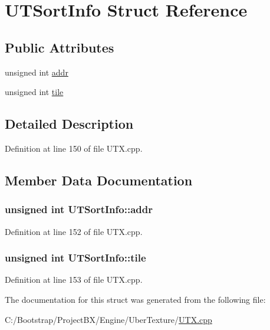 \hypertarget{struct_u_t_sort_info}{
\section{UTSortInfo Struct Reference}
\label{struct_u_t_sort_info}
}
\subsection*{Public Attributes}
\begin{CompactItemize}
\item 
unsigned int \hyperlink{struct_u_t_sort_info_47f8c27d741ef4ea2b59a783fc054655}{addr}
\item 
unsigned int \hyperlink{struct_u_t_sort_info_bf2cd136028eec8403fa5b74a111f523}{tile}
\end{CompactItemize}


\subsection{Detailed Description}


Definition at line 150 of file UTX.cpp.

\subsection{Member Data Documentation}
\hypertarget{struct_u_t_sort_info_47f8c27d741ef4ea2b59a783fc054655}{
\subsubsection[{addr}]{\setlength{\rightskip}{0pt plus 5cm}unsigned int {\bf UTSortInfo::addr}}}
\label{struct_u_t_sort_info_47f8c27d741ef4ea2b59a783fc054655}




Definition at line 152 of file UTX.cpp.\hypertarget{struct_u_t_sort_info_bf2cd136028eec8403fa5b74a111f523}{
\subsubsection[{tile}]{\setlength{\rightskip}{0pt plus 5cm}unsigned int {\bf UTSortInfo::tile}}}
\label{struct_u_t_sort_info_bf2cd136028eec8403fa5b74a111f523}




Definition at line 153 of file UTX.cpp.

The documentation for this struct was generated from the following file:\begin{CompactItemize}
\item 
C:/Bootstrap/ProjectBX/Engine/UberTexture/\hyperlink{_u_t_x_8cpp}{UTX.cpp}\end{CompactItemize}
